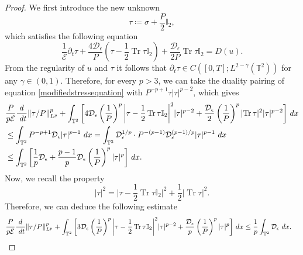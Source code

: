 \documentclass[10pt,a4paper]{amsart}
\DeclareMathOperator{\Tr}{Tr}
\newcommand{\dt}{\ {\rm d} t }
\newcommand{\dx}{\ {\rm d} {x}}
\begin{document}
\begin{proof}
We first introduce the new unknown
\begin{equation} \label{newunkown}
\tau \coloneqq \sigma + \frac{P}{2} \mathbb I_2,
\end{equation}
which satisfies the following equation
\begin{equation} \label{modifiedstressequation}
\dfrac{1}{\mathcal E} \partial_t \tau + \dfrac{4 \mathcal{D}_\epsilon}{P} (\tau - \frac{1}{2} \Tr \tau \mathbb I_2) + \dfrac{\mathcal{D}_\epsilon}{2P} \Tr \tau \mathbb I_2 = D(u).
\end{equation}
From the regularity of $u$ and $\tau$ it follows that $\partial_t \tau \in C([0,T]; L^{2 - \gamma} (\mathbb{T}^2))$ for any $\gamma \in (0,1)$. Therefore, for every $p > 3$, we can take the duality pairing of equation \eqref{modifiedstressequation} with $P^{-p+1} \tau \lvert \tau \rvert^{p-2}$, which gives
\begin{align*}
&\frac{P}{p \mathcal{E}} \frac{\textrm{d}}{\dt} \lVert \tau / P \rVert_{L^p}^p + \int_{\mathbb{T}^2} \bigg[ 4 \mathcal{D}_\epsilon \left( \frac{1}{P} \right)^p \bigg\lvert \tau - \frac{1}{2} \Tr \tau \mathbb I_2 \bigg\rvert^2 \lvert \tau \rvert^{p-2} + \dfrac{\mathcal{D}_\epsilon}{2} \left( \frac{1}{P} \right)^p \lvert \Tr \tau \rvert^2 \lvert \tau \rvert^{p-2} \bigg] \dx \\
&\leq \int_{\mathbb{T}^2} P^{-p+1} \mathcal{D}_\epsilon \lvert \tau \rvert^{p-1} \dx = \int_{\mathbb{T}^2} \mathcal{D}_\epsilon^{1/p} \cdot P^{-(p-1)} \mathcal{D}_\epsilon^{(p-1)/p} \lvert \tau \rvert^{p-1} \dx \\
&\leq \int_{\mathbb{T}^2} \bigg[\frac{1}{p} \mathcal{D}_\epsilon + \frac{p-1}{p} \mathcal{D}_\epsilon \left( \frac{1}{P} \right)^p \lvert \tau \rvert^p \bigg] \dx.
\end{align*}
Now, we recall the property
\begin{equation*}
\lvert \tau \rvert^2 = \bigg\lvert \tau - \frac{1}{2} \Tr \tau \mathbb I_2 \bigg\rvert^2 + \frac{1}{2} \lvert \Tr \tau \rvert^2.
\end{equation*}
Therefore, we can deduce the following estimate
\begin{align*}
\frac{P}{p \mathcal{E}} \frac{\textrm{d}}{\dt} \lVert \tau / P \rVert_{L^p}^p &+ \int_{\mathbb{T}^2} \bigg[ 3 \mathcal{D}_\epsilon \left( \frac{1}{P} \right)^p \bigg\lvert \tau - \frac{1}{2} \Tr \tau \mathbb I_2 \bigg\rvert^2 \lvert \tau \rvert^{p-2} + \dfrac{\mathcal{D}_\epsilon}{p} \left( \frac{1}{P} \right)^p \lvert \tau \rvert^p \bigg] \dx \leq \frac{1}{p} \int_{\mathbb{T}^2} \mathcal{D}_\epsilon \dx.

\end{align*}
\end{proof}
\end{document}
